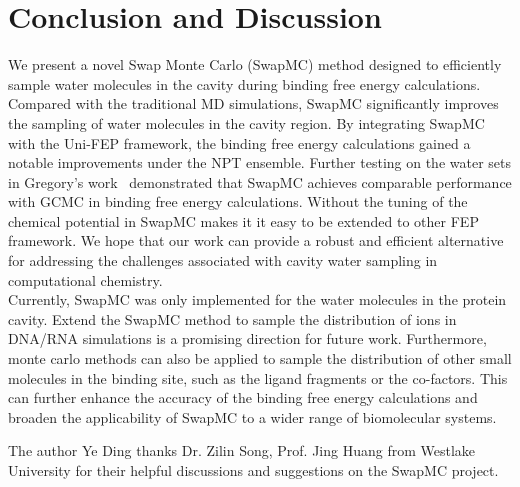 \documentclass[journal=jacsat,manuscript=article]{achemso}
\begin{document}
\section{Conclusion and Discussion}
We present a novel Swap Monte Carlo (SwapMC) method designed to efficiently sample water molecules in the cavity during binding free energy calculations.
Compared with the traditional MD simulations, SwapMC significantly improves the sampling of water molecules in the cavity region.
By integrating SwapMC with the Uni-FEP framework, the binding free energy calculations gained a notable improvements under the NPT ensemble.
Further testing on the water sets in Gregory's work~\cite{ross2020enhancing} demonstrated that SwapMC achieves comparable performance with GCMC in binding free energy calculations. 
Without the tuning of the chemical potential in SwapMC makes it it easy to be extended to other FEP framework. 
We hope that our work can provide a robust and efficient alternative for addressing the challenges associated with cavity water sampling in computational chemistry. \\
\newline
Currently, SwapMC was only implemented for the water molecules in the protein cavity.
Extend the SwapMC method to sample the distribution of ions in DNA/RNA simulations is a promising direction for future work.
Furthermore, monte carlo methods can also be applied to sample the distribution of other small molecules in the binding site,
such as the ligand fragments or the co-factors\cite{Cezar2020,goel2021rapid}.
This can further enhance the accuracy of the binding free energy calculations and broaden the applicability of SwapMC to a wider range of biomolecular systems.


\begin{acknowledgement}
The author Ye Ding thanks Dr. Zilin Song, Prof. Jing Huang from Westlake University for their helpful discussions and suggestions on the SwapMC project.
\end{acknowledgement}

\end{document}
